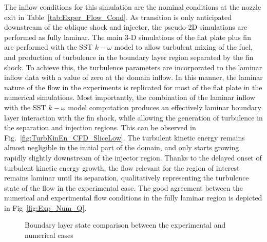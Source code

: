 \documentclass{AIAA}
\begin{document}
The inflow conditions for this simulation are the nominal conditions at the nozzle exit in Table~\ref{tab:Exper_Flow_Cond}. As transition is only anticipated downstream of the oblique shock and injector, the pseudo-2D simulations are performed as fully laminar. 
The main 3-D simulations of the flat plate plus fin are performed with the SST $k-\omega$ model to allow turbulent mixing of the fuel, and production of turbulence in the boundary layer region separated by the fin shock. To achieve this, the turbulence parameters are incorporated to the laminar inflow data with a value of zero at the domain inflow. In this manner, the laminar nature of the flow in the experiments is replicated for most of the flat plate in the numerical simulations. Most importantly, the combination of the laminar inflow with the SST $k-\omega$ model computation produces an effectively laminar boundary layer interaction with the fin shock, while allowing the generation of turbulence in the separation and injection regions. This can be observed in Fig.~\ref{fig:TurbKinEn_CFD_SliceLow}. The turbulent kinetic energy remains almost negligible in the initial part of the domain, and only starts growing rapidly slightly downstream of the injector region. Thanks to the delayed onset of turbulent kinetic energy growth, the flow relevant for the region of interest remains laminar until its separation, qualitatively representing the turbulence state of the flow in the experimental case. The good agreement between the numerical and experimental flow conditions in the fully laminar region is depicted in Fig~\ref{fig:Exp_Num_Q}.
%
\begin{figure}[!h]
\center
{}
\caption{Boundary layer state comparison between the experimental and numerical cases}
\label{fig:Num_Exp_BLcompar}
\end{figure} 
\end{document}
